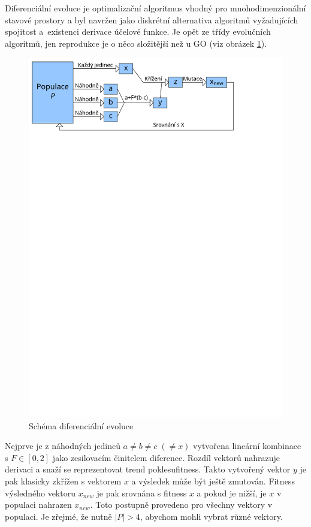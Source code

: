 Diferenciální evoluce \cite{DE Storn} je optimalizační algoritmus vhodný pro mnohodimenzionální stavové prostory a byl navržen jako diskrétní alternativa algoritmů vyžadujících spojitost a~existenci derivace účelové funkce. Je opět ze třídy evolučních algoritmů, jen reprodukce je o něco složitější než u GO (viz obrázek \ref{DE fig}).

\begin{figure}[h!]
  \includegraphics[width=\textwidth]{img/DE}
  \caption{Schéma diferenciální evoluce}\label{DE fig}
\end{figure}

Nejprve je z náhodných jedinců $a \ne b \ne c \; (\ne x)$ vytvořena lineární kombinace \linebreak s $F \in [0,2]$ jako zesilovacím činitelem diference. Rozdíl vektorů nahrazuje derivaci a snaží se reprezentovat \bq trend poklesu\eq   fitness. Takto vytvořený vektor $y$ je pak klasicky zkřížen s vektorem $x$ a výsledek může být ještě zmutován. Fitness výsledného vektoru $x_{new}$ je pak srovnána s fitness $x$ a pokud je nižší, je $x$ v populaci nahrazen $x_{new}$. Toto postupně provedeno pro všechny vektory v populaci. Je zřejmé, že nutně $|P| > 4$, abychom mohli vybrat různé vektory.

